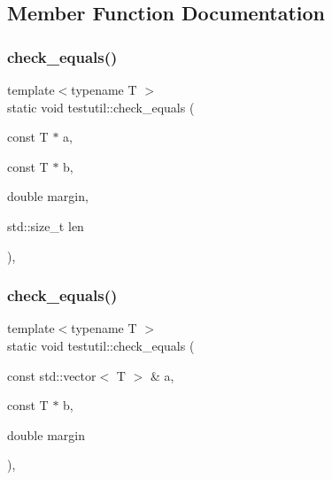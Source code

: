 \subsection{Member Function Documentation}
\mbox{\label{structtestutil_a5b49bfffa8e323fbac9b0a82f243156e}} 
\subsubsection{\texorpdfstring{check\+\_\+equals()}{check\_equals()}\hspace{0.1cm}{\footnotesize\ttfamily [1/4]}}
{\footnotesize\ttfamily template$<$typename T $>$ \\
static void testutil\+::check\+\_\+equals (\begin{DoxyParamCaption}\item[{const T $\ast$}]{a,  }\item[{const T $\ast$}]{b,  }\item[{double}]{margin,  }\item[{std\+::size\+\_\+t}]{len }\end{DoxyParamCaption})\hspace{0.3cm}{\ttfamily [inline]}, {\ttfamily [static]}}

\mbox{\label{structtestutil_aacb9c6f68af8f3217e590ed3b82d1a4f}} 
\subsubsection{\texorpdfstring{check\+\_\+equals()}{check\_equals()}\hspace{0.1cm}{\footnotesize\ttfamily [2/4]}}
{\footnotesize\ttfamily template$<$typename T $>$ \\
static void testutil\+::check\+\_\+equals (\begin{DoxyParamCaption}\item[{const std\+::vector$<$ T $>$ \&}]{a,  }\item[{const T $\ast$}]{b,  }\item[{double}]{margin }\end{DoxyParamCaption})\hspace{0.3cm}{\ttfamily [inline]}, {\ttfamily [static]}}

